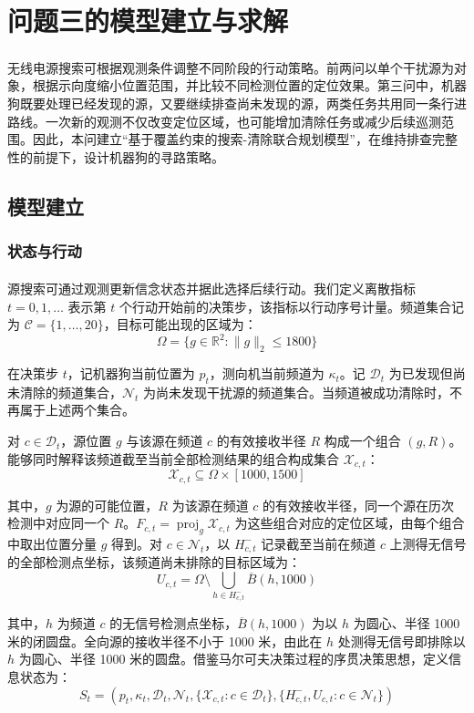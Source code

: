 \section{问题三的模型建立与求解}

无线电源搜索可根据观测条件调整不同阶段的行动策略\textsuperscript{\cite{ref4}}。前两问以单个干扰源为对象，根据示向度缩小位置范围，并比较不同检测位置的定位效果。第三问中，机器狗既要处理已经发现的源，又要继续排查尚未发现的源，两类任务共用同一条行进路线。一次新的观测不仅改变定位区域，也可能增加清除任务或减少后续巡测范围。因此，本问建立``基于覆盖约束的搜索-清除联合规划模型''，在维持排查完整性的前提下，设计机器狗的寻路策略。

\subsection{模型建立}

\subsubsection{状态与行动}

源搜索可通过观测更新信念状态并据此选择后续行动\textsuperscript{\cite{ref7}}。我们定义离散指标 \(t=0,1,\ldots\) 表示第 \(t\) 个行动开始前的决策步，该指标以行动序号计量。频道集合记为 \(\mathcal C=\{1,\ldots,20\}\)，目标可能出现的区域为：
\[
\Omega=\{g\in\mathbb R^2:\|g\|_2\le1800\}
\]

在决策步 \(t\)，记机器狗当前位置为 \(p_t\)，测向机当前频道为 \(\kappa_t\)。记 \(\mathcal D_t\) 为已发现但尚未清除的频道集合，\(\mathcal N_t\) 为尚未发现干扰源的频道集合。当频道被成功清除时，不再属于上述两个集合。

对 \(c\in\mathcal D_t\)，源位置 \(g\) 与该源在频道 \(c\) 的有效接收半径 \(R\) 构成一个组合 \((g,R)\)。能够同时解释该频道截至当前全部检测结果的组合构成集合 \(\mathcal X_{c,t}\)：
\[
\mathcal X_{c,t}\subseteq\Omega\times[1000,1500]
\]

其中，\(g\) 为源的可能位置，\(R\) 为该源在频道 \(c\) 的有效接收半径，同一个源在历次检测中对应同一个 \(R\)。\(F_{c,t}=\operatorname{proj}_g\mathcal X_{c,t}\) 为这些组合对应的定位区域，由每个组合中取出位置分量 \(g\) 得到。对 \(c\in\mathcal N_t\)，以 \(H^-_{c,t}\) 记录截至当前在频道 \(c\) 上测得无信号的全部检测点坐标，该频道尚未排除的目标区域为：
\[
U_{c,t}
=
\Omega\setminus
\bigcup_{h\in H^-_{c,t}}\overline B(h,1000)
\]

其中，\(h\) 为频道 \(c\) 的无信号检测点坐标，\(\overline B(h,1000)\) 为以 \(h\) 为圆心、半径 1000 米的闭圆盘。全向源的接收半径不小于 1000 米，由此在 \(h\) 处测得无信号即排除以 \(h\) 为圆心、半径 1000 米的圆盘。借鉴马尔可夫决策过程的序贯决策思想，定义信息状态为：
\[
S_t=
\left(
p_t,\kappa_t,\mathcal D_t,\mathcal N_t,
\{\mathcal X_{c,t}:c\in\mathcal D_t\},
\{H^-_{c,t},U_{c,t}:c\in\mathcal N_t\}
\right)
\tag{20}
\]

